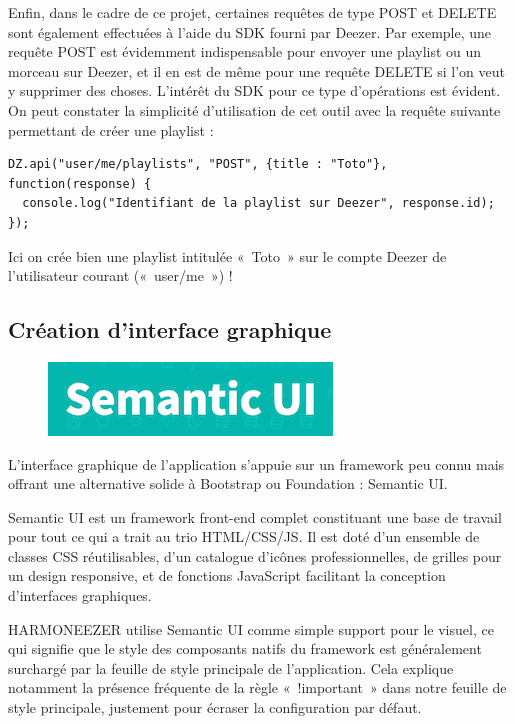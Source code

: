 \documentclass[a4paper,12pt]{article}
\begin{document}
Enfin, dans le cadre de ce projet, certaines requêtes de type POST et DELETE sont également effectuées à l'aide du SDK fourni par Deezer. Par exemple, une requête POST est évidemment indispensable pour envoyer une playlist ou un morceau sur Deezer, et il en est de même pour une requête DELETE si l'on veut y supprimer des choses. L'intérêt du SDK pour ce type d'opérations est évident. On peut constater la simplicité d'utilisation de cet outil avec la requête suivante permettant de créer une playlist :

\vspace{7pt}

\begin{lstlisting}
DZ.api("user/me/playlists", "POST", {title : "Toto"}, function(response) {
  console.log("Identifiant de la playlist sur Deezer", response.id);
});
\end{lstlisting}

Ici on crée bien une playlist intitulée «~Toto~» sur le compte Deezer de l'utilisateur courant («~user/me~») !

\newpage

\subsection{Création d'interface graphique}

\begin{figure}[!h]
  \begin{center}
    \includegraphics[scale=0.5]{logo-semanticui.png}
  \end{center}
\end{figure}

L'interface graphique de l'application s'appuie sur un framework peu connu mais offrant une alternative solide à Bootstrap ou Foundation : Semantic UI.

Semantic UI est un framework front-end complet constituant une base de travail pour tout ce qui a trait au trio HTML/CSS/JS. Il est doté d'un ensemble de classes CSS réutilisables, d'un catalogue d'icônes professionnelles, de grilles pour un design responsive, et de fonctions JavaScript facilitant la conception d'interfaces graphiques.

HARMONEEZER utilise Semantic UI comme simple support pour le visuel, ce qui signifie que le style des composants natifs du framework est généralement surchargé par la feuille de style principale de l'application. Cela explique notamment la présence fréquente de la règle «~!important~» dans notre feuille de style principale, justement pour écraser la configuration par défaut.
\end{document}

